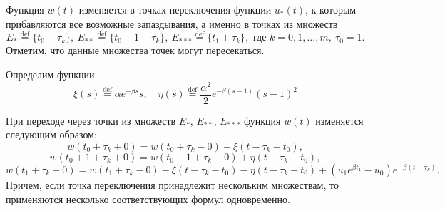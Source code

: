Функция $w(t)$ изменяется в точках переключения функции $u_*(t)$, к которым прибавляются все возможные запаздывания, а именно в точках из множеств
%
\[E_*\stackrel{\text{def}}{=}\{t_0 + \tau_k\},\ E_{**}\stackrel{\text{def}}{=}\{t_0 + 1 + \tau_k\},\ E_{***}\stackrel{\text{def}}{=}\{t_1 + \tau_k\},\text{ где }k=0,1,\ldots,m,\ \tau_0=1.\]
%
Отметим, что данные множества точек могут пересекаться.

Определим функции 
$$\xi(s)\stackrel{\text{def}}{=}\alpha e^{-\beta s} s ,\quad \eta(s)\stackrel{\text{def}}{=}\frac{\alpha^2}{2} e^{-\beta( s-1)} (s-1)^2$$
\begin{lemma}
	\label{lm:lem_w_*}
	При переходе через точки из множеств $E_*$, $E_{**}$, $E_{***}$ функция $w(t)$ изменяется следующим образом:
	\begin{equation}
		\label{eq:w_*}
		w(t_0 + \tau_k+0) = w(t_0 + \tau_k-0) +  \xi(t-\tau_k-t_0),
	\end{equation}
	\begin{equation}
		\label{eq:w_**}
		w(t_0 +1+ \tau_k+0) = w(t_0 +1+ \tau_k-0) +\eta(t-\tau_k-t_0), 
	\end{equation}
	\begin{equation}
		\label{eq:w_***} 
		w(t_1 + \tau_k+0) = w(t_1 + \tau_k-0)-\xi(t-\tau_k-t_0)-\eta(t-\tau_k-t_0)+
		(u_1 e^{\beta t_1}-u_0)e^{-\beta(t-\tau_k)}.
	\end{equation}
	Причем, если точка переключения принадлежит нескольким множествам, то применяются несколько  соответствующих формул одновременно.
\end{lemma}


